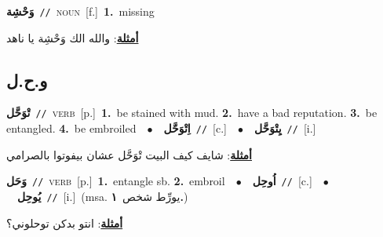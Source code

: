 \documentclass[10pt,a4paper,twoside]{article} %
\begin{document}
\begin{multicols}{2}
{\setlength\topsep{0pt}\textbf{\foreignlanguage{arabic}{وَحْشِة}}\ {\color{gray}\texttt{//}\color{black}}\ \textsc{noun}\ [f.]\ \textbf{1.}~missing\  \begin{flushright}\color{gray}\foreignlanguage{arabic}{\textbf{\underline{\foreignlanguage{arabic}{أمثلة}}}: والله الك وَحْشِة يا ناهد}\end{flushright}\color{black}} \vspace{2mm}

\vspace{-3mm}
\subsection*{\color{blue}\foreignlanguage{arabic}{و.ح.ل}\color{blue}{}} 

{\setlength\topsep{0pt}\textbf{\foreignlanguage{arabic}{تْوَحَّل}}\ {\color{gray}\texttt{//}\color{black}}\ \textsc{verb}\ [p.]\ \textbf{1.}~be stained with mud.  \textbf{2.}~have a bad reputation.  \textbf{3.}~be entangled.  \textbf{4.}~be embroiled\ \ $\bullet$\ \ \setlength\topsep{0pt}\textbf{\foreignlanguage{arabic}{اِتْوَحَّل}}\ {\color{gray}\texttt{//}\color{black}}\ [c.]\ \ $\bullet$\ \ \setlength\topsep{0pt}\textbf{\foreignlanguage{arabic}{يِتْوَحَّل}}\ {\color{gray}\texttt{//}\color{black}}\ [i.]\  \begin{flushright}\color{gray}\foreignlanguage{arabic}{\textbf{\underline{\foreignlanguage{arabic}{أمثلة}}}: شايف كيف البيت تْوَحَّل عشان بيفوتوا بالصرامي}\end{flushright}\color{black}} \vspace{2mm}

{\setlength\topsep{0pt}\textbf{\foreignlanguage{arabic}{وَحَل}}\ {\color{gray}\texttt{//}\color{black}}\ \textsc{verb}\ [p.]\ \textbf{1.}~entangle sb.  \textbf{2.}~embroil\ \ $\bullet$\ \ \setlength\topsep{0pt}\textbf{\foreignlanguage{arabic}{اُوحِل}}\ {\color{gray}\texttt{//}\color{black}}\ [c.]\ \ $\bullet$\ \ \setlength\topsep{0pt}\textbf{\foreignlanguage{arabic}{يُوحِل}}\ {\color{gray}\texttt{//}\color{black}}\ [i.]\ \color{gray}(msa. \foreignlanguage{arabic}{يورِّط شخص}~\foreignlanguage{arabic}{\textbf{١.}})\color{black}\  \begin{flushright}\color{gray}\foreignlanguage{arabic}{\textbf{\underline{\foreignlanguage{arabic}{أمثلة}}}: انتو بدكن توحلوني؟}\end{flushright}\color{black}} \vspace{2mm}


\end{multicols}
\end{document}
